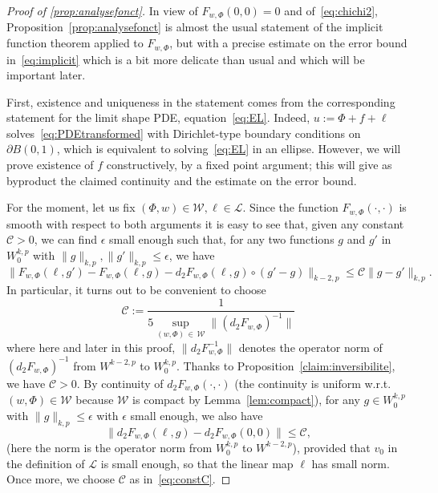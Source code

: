 \documentclass[AHL,Unicode,longabstracts,published]{cedram}
\newcommand{\clL}{\mathcal{L}}
\newcommand{\clW}{\mathcal{W}}
\newcommand{\clC}{\mathcal{C}}
\newcommand{\norm}[1]{\lVert #1 \rVert}
\newcommand{\eps}{\epsilon}
\begin{document}
\begin{proof}[Proof of \cref{prop:analysefonct}]
In view of $F_{w,\Phi}(0,0)=0$ and of~\eqref{eq:chichi2},
Proposition~\ref{prop:analysefonct} is almost the usual statement of the implicit function theorem applied to $F_{w,\Phi}$, but with a precise estimate on the error bound in~\eqref{eq:implicit} which is a bit more delicate than usual and which will be important later.

First, existence and uniqueness in the statement comes from the corresponding statement for the limit shape PDE, equation~\eqref{eq:EL}. Indeed, $u:=\Phi + f+\ell$ solves~\eqref{eq:PDEtransformed} with Dirichlet-type boundary conditions on $\partial B(0,1)$, which is equivalent to solving~\eqref{eq:EL} in an ellipse. However, we will prove existence of $f$ constructively, by a fixed point argument; this will give as byproduct the claimed continuity and the estimate on the error bound.

For the moment, let us fix $(\Phi, w)\in\clW, \ell\in\clL$. Since the function $F_{w,\Phi}(\cdot, \cdot)$ is smooth with respect to both arguments it is easy to see that, given any constant $\clC>0$, we can find $\eps$ small enough such that, for any two functions $g$ and $g'$ in $W^{k,p}_0$ with $\norm{g}_{k,p},\norm{g'}_{k,p} \leq \eps$, we have
\begin{equation}\label{eq:boundDLF}
\big\|F_{w,\Phi}(\ell, g') - F_{w,\Phi}(\ell, g) - d_2 F_{w,\Phi}(\ell, g) \circ (g' - g) \big\|_{{k-2, p}} \leq \clC\norm{g - g'}_{{k, p}}.
\end{equation}
In particular, it turns out to be convenient to choose
\begin{equation}\label{eq:constC}
\clC:=\frac{1}{5 \sup_{(w,\Phi)\,\in\,\clW}\norm{(d_2 F_{w,\Phi})^{-1}}}
\end{equation}
where here and later in this proof, $\norm{d_2 F_{w,\Phi}^{-1}}$ denotes the operator norm of $(d_2 F_{w,\Phi})^{-1}$ from $W^{k-2,p}$ to $W^{k,p}_0$. Thanks to Proposition~\ref{claim:inversibilite}, we have $\clC>0$. By continuity of $d_2 F_{w,\Phi}(\cdot,\cdot)$ (the continuity is uniform w.r.t. $(w,\Phi)\in\clW$ because $\clW$ is compact by Lemma~\ref{lem:compact}), for any $g\in W^{k,p}_0$ with $\norm{g}_{k,p} \leq \eps$ with $\eps$ small enough, we also have
\begin{equation}\label{eq:bounddF-1}
\big\|d_2 F_{w,\Phi}(\ell,g) - d_2 F_{w,\Phi}(0,0)\big\|
\leq \clC,
\end{equation}
(here the norm is the operator norm from $W^{k,p}_0$ to $W^{k-2,p}$), provided that $v_0$ in the definition of $\clL$ is small enough, so that the linear map $\ell$ has small norm. Once more, we choose $\clC$ as in~\eqref{eq:constC}.


\end{proof}
\end{document}
